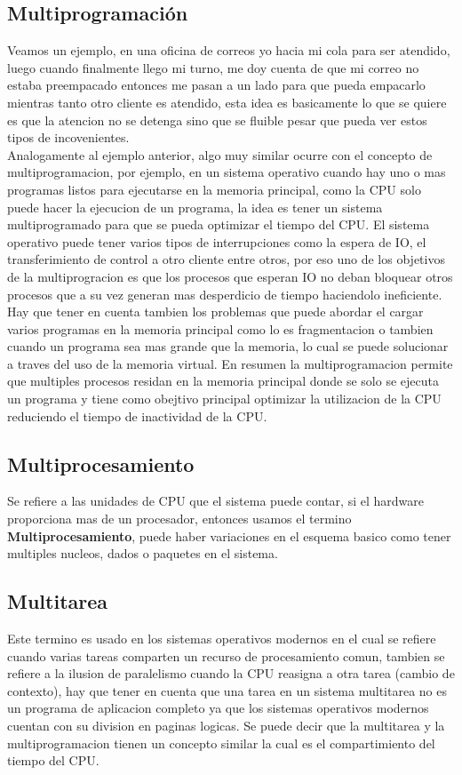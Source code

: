 \documentclass[conference,letterpaper]{IEEEtran}
\begin{document}
\subsection{Multiprogramaci\'on}
Veamos un ejemplo, en una oficina de correos yo hacia mi cola para ser atendido, luego cuando finalmente llego mi turno, me doy cuenta de que mi correo no estaba preempacado entonces me pasan a un lado para que pueda empacarlo mientras tanto otro cliente es atendido, esta idea es basicamente lo que se quiere es que la atencion no se detenga sino que se fluible pesar que  pueda ver estos tipos de incovenientes.\\

Analogamente al ejemplo anterior, algo muy similar ocurre con el concepto de multiprogramacion, por ejemplo, en un sistema operativo cuando hay uno o mas programas listos para ejecutarse en la memoria principal, como la CPU solo puede hacer la ejecucion de un programa, la idea es tener un sistema multiprogramado para que se pueda optimizar el tiempo del CPU. El sistema operativo puede tener varios tipos de interrupciones como la espera de IO, el transferimiento de control a otro cliente entre otros, por eso uno de los objetivos de la multiprogracion es que los procesos que esperan IO no deban bloquear otros procesos que a su vez generan mas desperdicio de tiempo haciendolo ineficiente.\\

Hay que tener en cuenta tambien los problemas que puede abordar el cargar varios programas en la memoria principal como lo es fragmentacion o tambien cuando un programa sea mas grande que la memoria, lo cual se puede solucionar a traves del uso de la memoria virtual. En resumen la multiprogramacion permite que multiples procesos residan en la memoria principal donde se solo se ejecuta un programa y tiene como obejtivo principal optimizar la utilizacion  de la CPU reduciendo el tiempo de inactividad de la CPU.\\

\subsection{Multiprocesamiento}
Se refiere a las unidades de CPU que el sistema puede contar, si el hardware proporciona mas de un procesador, entonces usamos el termino \textbf{Multiprocesamiento}, puede haber variaciones en el esquema basico como tener multiples nucleos, dados o paquetes en el sistema.

\subsection{Multitarea}
Este termino es usado en los sistemas operativos modernos en el cual se refiere cuando varias tareas comparten un recurso de procesamiento comun, tambien se refiere a la ilusion de paralelismo cuando la CPU reasigna a otra tarea (cambio de contexto), hay que tener en cuenta que una tarea en un sistema multitarea no es un programa de aplicacion completo ya que los sistemas operativos modernos cuentan con su division en paginas logicas. Se puede decir que la multitarea y la multiprogramacion tienen un concepto similar la cual es el compartimiento del tiempo del CPU.
\end{document}

